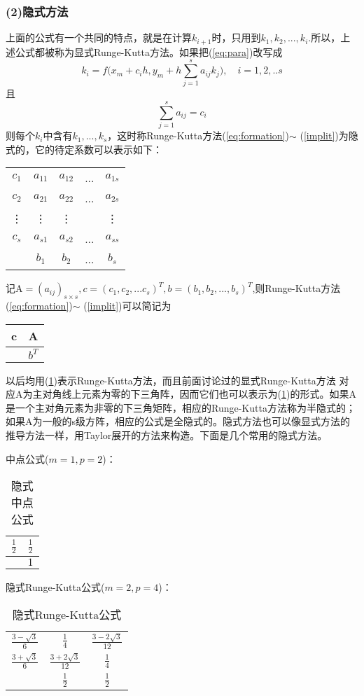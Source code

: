 \subsubsection{(2)隐式方法}

上面的公式有一个共同的特点，就是在计算$k_{i+1}$时，只用到$k_1,k_2,...,k_i$.所以，上述公式都被称为显式Runge-Kutta方法。如果把(\ref{eq:para})改写成
\begin{equation}\label{implit}
		k_i = f\bigg( x_m+c_i h , y_m+ h\sum_{j=1}^sa_{ij}k_j\bigg), \quad i=1,2,..s
\end{equation}
且
$$\sum_{j=1}^s a_{ij} = c_i$$
则每个$k_i$中含有$k_1,...,k_s$，这时称Runge-Kutta方法(\ref{eq:formation})$\sim$ (\ref{implit})为隐式的，它的待定系数可以表示如下：
\begin{table}[H]
		\centering
		\begin{tabular}{c|cccc}
				$c_1$ & $a_{11}$ & $a_{12}$ & ... & $a_{1s}$\\
		        $c_2$ & $a_{21}$ & $a_{22}$ & ... & $a_{2s}$\\
		        \vdots & \vdots & \vdots &   & \vdots \\
		       $c_s$ & $a_{s1}$ & $a_{s2}$ & ... & $a_{ss}$\\ \hline
		            &  $b_1$   & $b_2$   &  ...& $b_s$
		\end{tabular}
\end{table}
记A$=(a_{ij})_{s \times s}, c=(c_1,c_2,...c_s)^T, b=(b_1,b_2,...,b_s)^T$,则Runge-Kutta方法(\ref{eq:formation})$\sim$ (\ref{implit})可以简记为
\begin{table}[htbp!]\label{coff}
		\centering
		\begin{tabular}{c|c}
				c & A\\ \hline
				  & $b^T$ 
		\end{tabular}
\end{table}
以后均用(\ref{coff})表示Runge-Kutta方法，而且前面讨论过的显式Runge-Kutta方法
对应A为主对角线上元素为零的下三角阵，因而它们也可以表示为(\ref{coff})的形式。如果A是一个主对角元素为非零的下三角矩阵，相应的Runge-Kutta方法称为半隐式的；如果A为一般的s级方阵，相应的公式是全隐式的。隐式方法也可以像显式方法的推导方法一样，用Taylor展开的方法来构造。下面是几个常用的隐式方法。

中点公式($m=1,p=2$)：
\begin{table}[htbp!]\label{coff1}
		\centering
		\begin{tabular}{c|c}
				$\frac{1}{2}$& $\frac{1}{2}$\\ \hline
				  & $1$ 
		\end{tabular}\caption{隐式中点公式}
\end{table}
\newpage
隐式Runge-Kutta公式($m=2,p=4$)：
\begin{table}[htbp!]\label{coff2}
		\centering
		\begin{tabular}{c|cc}
				$\frac{3-\sqrt{3}}{6}$& $\frac{1}{4}$ & $\frac{3-2\sqrt{3}}{12}$\\ 
				$\frac{3+\sqrt{3}}{6}$ & $\frac{3+2\sqrt{3}}{12}$  &$ \frac{1}{4}$ \\\hline
                                                        &$ \frac{1}{2}$ &$ \frac{1}{2}$
		\end{tabular}\caption{隐式Runge-Kutta公式}
\end{table}

